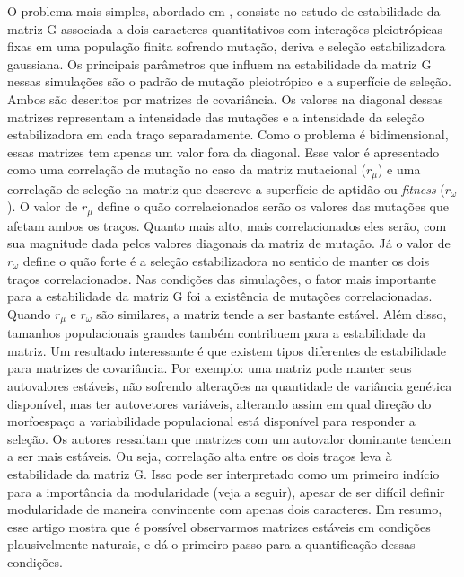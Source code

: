 O problema mais simples, abordado em \cite{Jones2003}, consiste no
estudo de estabilidade da matriz G associada a dois caracteres
quantitativos com interações pleiotrópicas fixas em uma população finita
sofrendo mutação, deriva e seleção estabilizadora gaussiana. 
Os principais parâmetros que influem na estabilidade da matriz G nessas
simulações são o padrão de mutação pleiotrópico e a superfície de
seleção. 
Ambos são descritos por matrizes de covariância. 
Os valores na diagonal dessas matrizes representam a intensidade das
mutações e a intensidade da seleção estabilizadora em cada traço
separadamente. 
Como o problema é bidimensional, essas matrizes tem apenas um valor fora
da diagonal. 
Esse valor é apresentado como uma correlação de mutação no caso da
matriz mutacional ($r_\mu$) e uma correlação de seleção na matriz que
descreve a superfície de aptidão ou {\it fitness} ($r_\omega$). 
O valor de $r_\mu$ define o quão correlacionados serão os valores das
mutações que afetam ambos os traços. 
Quanto mais alto, mais correlacionados eles serão, com sua magnitude
dada pelos valores diagonais da matriz de mutação. 
Já o valor de $r_\omega$ define o quão forte é a seleção estabilizadora
no sentido de manter os dois traços correlacionados. 
Nas condições das simulações, o fator mais importante para a
estabilidade da matriz G foi a existência de mutações correlacionadas. 
Quando $r_\mu$ e $r_\omega$ são similares, a matriz tende a ser bastante
estável. 
Além disso, tamanhos populacionais grandes também contribuem para a
estabilidade da matriz. 
Um resultado interessante é que existem tipos diferentes de estabilidade
para matrizes de covariância. 
Por exemplo: uma matriz pode manter seus autovalores estáveis, não
sofrendo alterações na quantidade de variância genética disponível, mas
ter autovetores variáveis, alterando assim em qual direção do
morfoespaço a variabilidade populacional está disponível para responder
a seleção. 
Os autores ressaltam que matrizes com um autovalor dominante tendem a
ser mais estáveis. 
Ou seja, correlação alta entre os dois traços leva à estabilidade da
matriz G. 
Isso pode ser interpretado como um primeiro indício para a importância
da modularidade (veja a seguir), apesar de ser difícil definir
modularidade de maneira convincente com apenas dois caracteres. 
Em resumo, esse artigo mostra que é possível observarmos matrizes
estáveis em condições plausivelmente naturais, e dá o primeiro passo
para a quantificação dessas condições. 

